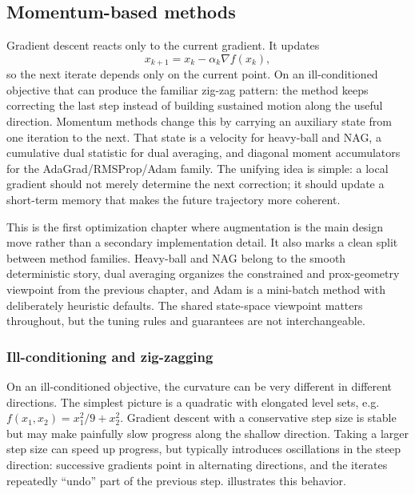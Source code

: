 \subsection{Momentum-based methods}
\label{subsec:momentum-based-methods}

Gradient descent reacts only to the current gradient.
It updates
\[
  x_{k+1} = x_k - \alpha_k \nabla f(x_k),
\]
so the next iterate depends only on the current point.
On an ill-conditioned objective that can produce the familiar zig-zag pattern: the method keeps correcting the last step instead of building sustained motion along the useful direction.
Momentum methods change this by carrying an auxiliary state from one iteration to the next.
That state is a velocity for heavy-ball and NAG, a cumulative dual statistic for dual averaging, and diagonal moment accumulators for the AdaGrad/RMSProp/Adam family.
The unifying idea is simple: a local gradient should not merely determine the next correction; it should update a short-term memory that makes the future trajectory more coherent.

This is the first optimization chapter where augmentation is the main design move rather than a secondary implementation detail.
It also marks a clean split between method families.
Heavy-ball and NAG belong to the smooth deterministic story, dual averaging organizes the constrained and prox-geometry viewpoint from the previous chapter, and Adam is a mini-batch method with deliberately heuristic defaults.
The shared state-space viewpoint matters throughout, but the tuning rules and guarantees are not interchangeable.

\subsubsection{Ill-conditioning and zig-zagging}
\label{subsubsec:momentum-motivation}

On an ill-conditioned objective, the curvature can be very different in different directions.
The simplest picture is a quadratic with elongated level sets, e.g.\ $f(x_1,x_2)=x_1^2/9 + x_2^2$.
Gradient descent with a conservative step size is stable but may make painfully slow progress along the shallow direction.
Taking a larger step size can speed up progress, but typically introduces oscillations in the steep direction: successive gradients point in alternating directions, and the iterates repeatedly ``undo'' part of the previous step.
 illustrates this behavior.

